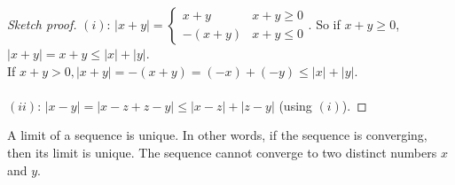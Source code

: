 \documentclass[12pt]{article}
\begin{document}


\begin{proof}[Sketch proof]
  $(i)$:
  $|x+y| = \begin{cases}
    x + y & x + y \geq 0\\
    -(x+y) & x + y \leq 0
  \end{cases}$.
  So if $x + y \geq 0$, $|x+y| = x + y \leq |x| + |y|$. \\
  If $x+y >0, |x+y| = -(x+y) = (-x) + (-y) \leq |x| + |y|$.\\\\
  $(ii)$: $|x-y| = |x-z + z - y| \leq |x-z| + |z-y|$ (using $(i)$).
\end{proof}




\begin{theorem}
  A limit of a sequence is unique. In other words, if the sequence is converging, then its limit is unique. The sequence cannot converge to two distinct numbers $x$ and $y$.\footnotemark
\end{theorem}
\end{document}
